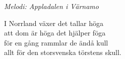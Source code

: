 {\footnotesize\textit{Melodi: Appladalen i Värnamo}}\par
\vspace{10pt}
I Norrland växer det tallar höga\\
att dom är höga det hjälper föga\\
för en gång rammlar de ändå kull\\
allt för den storsvenska törstens skull.
